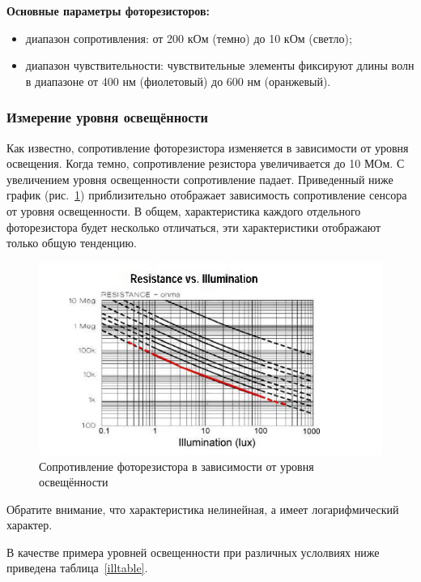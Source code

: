\documentclass[12pt]{article}
\begin{document}
\textbf{Основные параметры фоторезисторов:}

\begin{itemize}
    \item
          диапазон сопротивления: от 200 кОм (темно) до 10 кОм (светло);
    \item
          диапазон чувствительности: чувствительные элементы фиксируют длины волн в диапазоне от 400 нм (фиолетовый) до 600 нм (оранжевый).
\end{itemize}

\subsubsection{Измерение уровня освещённости}

Как известно, сопротивление фоторезистора изменяется в зависимости от уровня освещения. Когда темно, сопротивление резистора увеличивается до 10 МОм. С увеличением уровня освещенности сопротивление падает. Приведенный ниже график (рис.~\ref{phrl}) приблизительно отображает зависимость сопротивление сенсора от уровня освещенности. В общем, характеристика каждого отдельного фоторезистора будет несколько отличаться, эти характеристики отображают только общую тенденцию.

\begin{figure}[H]
    \centering
    \includegraphics{images/illumination.png}
    \caption{Сопротивление фоторезистора в зависимости от уровня освещённости}\label{phrl}
\end{figure}

Обратите внимание, что характеристика нелинейная, а имеет логарифмический характер.

В качестве примера уровней освещенности при различных услолвиях ниже приведена таблица~\ref{illtable}.
\end{document}
